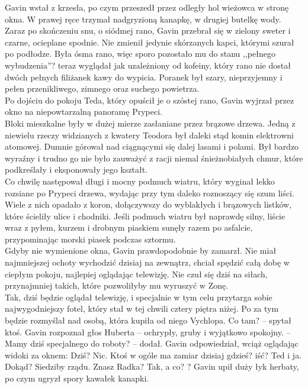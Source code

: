 \documentclass[../MAIN.tex]{subfiles}
\begin{document}
Gavin wstał z krzesła, po czym przeszedł przez odległy hol wieżowca w stronę okna. W prawej ręce trzymał nadgryzioną kanapkę, w drugiej butelkę wody.\\
Zaraz po skończeniu snu, o siódmej rano, Gavin przebrał się w zielony sweter i czarne, ocieplane spodnie. Nie zmienił jedynie skórzanych kapci, którymi szurał po podłodze. Była ósma rano, więc sporo pozostało mu do stanu ,,pełnego wybudzenia''? teraz wyglądał jak uzależniony od kofeiny, który rano nie dostał dwóch pełnych filiżanek kawy do wypicia. Poranek był szary, nieprzyjemny i pełen przenikliwego, zimnego oraz suchego powietrza.\\
Po dojściu do pokoju Teda, który opuścił je o szóstej rano, Gavin wyjrzał przez okno na niepowtarzalną panoramę Prypeci.\\
Bloki mieszkalne były w dużej mierze zasłaniane przez brązowe drzewa. Jedną z niewielu rzeczy widzianych z kwatery Teodora był daleki stąd komin elektrowni atomowej. Dumnie górował nad ciągnącymi się dalej lasami i polami. Był bardzo wyraźny i trudno go nie było zauważyć z racji niemal śnieżnobiałych chmur, które podkreślały i eksponowały jego kształt.\\
Co chwilę następował długi i mocny podmuch wiatru, który wyginał lekko rozsiane po Prypeci drzewa, wydając przy tym daleko roznoszący się szum liści. Wiele z nich opadało z koron, dołączywszy do wyblakłych i brązowych listków, które ścieliły ulice i chodniki. Jeśli podmuch wiatru był naprawdę silny, liście wraz z pyłem, kurzem i drobnym piaskiem sunęły razem po asfalcie, przypominając morski piasek podczas sztormu.\\
Gdyby nie wymienione okna, Gavin prawdopodobnie by zamarzł. Nie miał najmniejszej ochoty wychodzić dzisiaj na zewnątrz, chciał spędzić całą dobę w ciepłym pokoju, najlepiej oglądając telewizję. Nie czuł się dziś na siłach, przynajmniej takich, które pozwoliłyby mu wyruszyć w Zonę.\\
Tak, dziś będzie oglądał telewizję, i specjalnie w tym celu przytarga sobie najwygodniejszy fotel, który stał w tej chwili cztery piętra niżej. Po za tym będzie rozmyślał nad osobą, która kupiła od niego Vychlopa.
\sx Co tam? -- spytał ktoś. Gavin rozpoznał głos Huberta -- ochrypły, gruby i wyjątkowo spokojny. -- Mamy dziś specjalnego do roboty? -- dodał.
\qd
Gavin odpowiedział, wciąż oglądając widoki za oknem:
\sx Dziś? Nic. Ktoś w ogóle ma zamiar dzisiaj gdzieś? iść?
\xx Ted i ja.
\xx Dokąd?
\xx Siedziby rządu. Znasz Radka?
\xx Tak, a co? ? Gavin upił duży łyk herbaty, po czym ugryzł spory kawałek kanapki.
\end{document}
